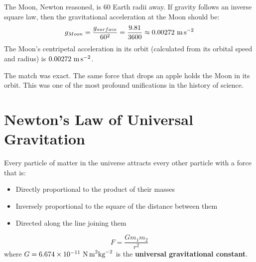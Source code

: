 The Moon, Newton reasoned, is $60$ Earth radii away.
If gravity follows an inverse square law, then the
gravitational acceleration at the Moon should be:
\[
  g_{Moon} = \frac{g_{surface}}{60^2}
  = \frac{9.81}{3600} \approx 0.00272\ \text{m\,s}^{-2}
\]
The Moon's centripetal acceleration in its orbit
(calculated from its orbital speed and radius) is
$0.00272\ \text{m\,s}^{-2}$.

The match was exact. The same force that drops an
apple holds the Moon in its orbit. This was one of
the most profound unifications in the history of
science.

\section{Newton's Law of Universal Gravitation}

\begin{lawbox}
Every particle of matter in the universe attracts
every other particle with a force that is:
\begin{itemize}[noitemsep]
  \item Directly proportional to the product of
  their masses
  \item Inversely proportional to the square of the
  distance between them
  \item Directed along the line joining them
\end{itemize}
\[
  F = \frac{Gm_1 m_2}{r^2}
\]
where $G = 6.674 \times 10^{-11}\ \text{N\,m}^2\text{kg}^{-2}$
is the \textbf{universal gravitational constant}.
\end{lawbox}

\begin{diagbox}
\begin{center}
\end{center}
\end{diagbox}

